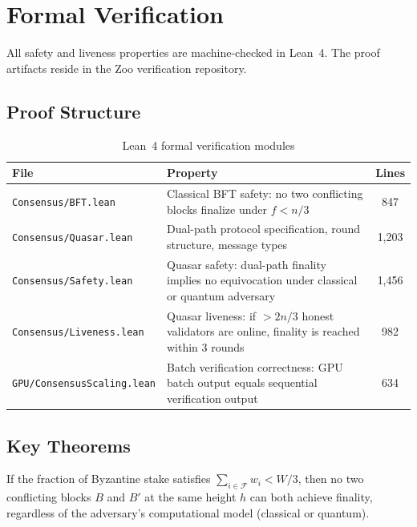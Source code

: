 \section{Formal Verification}


All safety and liveness properties are machine-checked in Lean~4. The proof artifacts reside in the Zoo verification repository.

\subsection{Proof Structure}

\begin{table}[h]
\centering
\begin{tabular}{lp{7cm}c}
\toprule
\textbf{File} & \textbf{Property} & \textbf{Lines} \\
\midrule
\texttt{Consensus/BFT.lean} & Classical BFT safety: no two conflicting blocks finalize under $f < n/3$ & 847 \\
\texttt{Consensus/Quasar.lean} & Dual-path protocol specification, round structure, message types & 1,203 \\
\texttt{Consensus/Safety.lean} & Quasar safety: dual-path finality implies no equivocation under classical or quantum adversary & 1,456 \\
\texttt{Consensus/Liveness.lean} & Quasar liveness: if $> 2n/3$ honest validators are online, finality is reached within 3 rounds & 982 \\
\texttt{GPU/ConsensusScaling.lean} & Batch verification correctness: GPU batch output equals sequential verification output & 634 \\
\bottomrule
\end{tabular}
\caption{Lean~4 formal verification modules}
\label{tab:lean-proofs}
\end{table}

\subsection{Key Theorems}

\begin{theorem}
\label{thm:safety}
If the fraction of Byzantine stake satisfies $\sum_{i \in \mathcal{F}} w_i < W/3$, then no two conflicting blocks $B$ and $B'$ at the same height $h$ can both achieve \Quasar{} finality, regardless of the adversary's computational model (classical or quantum).
\end{theorem}

